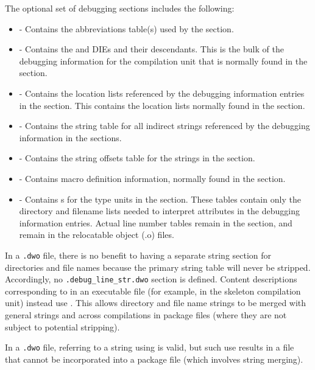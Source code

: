 The optional set of debugging sections includes the following:
\begin{itemize}
\item
\dotdebugabbrevdwo{} - Contains the abbreviations table(s) used by
the \dotdebuginfodwo{} section.
\item
\dotdebuginfodwo{} - Contains the \DWTAGcompileunit{} and
\DWTAGtypeunit{} DIEs and
their descendants. This is the bulk of the debugging
information for the compilation unit that is normally found
in the \dotdebuginfo{} section.
\item
\dotdebugloclistsdwo{} - Contains the location lists referenced by
the debugging information entries in the \dotdebuginfodwo{}
section. This contains the location lists normally found in 
the \dotdebugloclists{} section.
\bbeb
\item
\dotdebugstrdwo{} - Contains the string table for all indirect
strings referenced by the debugging information in the
\dotdebuginfodwo{} sections.
\item
\dotdebugstroffsetsdwo{} - Contains the string offsets table
for the strings in the \dotdebugstrdwo{}{} section.
\item
\dotdebugmacrodwo{} - Contains macro definition information,
normally found in the \dotdebugmacro{} section.
\item
\dotdebuglinedwo{} - Contains s 
for the type units in the \dotdebuginfodwo{} section. These tables
contain only the directory and filename lists needed to
interpret \DWATdeclfile{} attributes in the debugging
information entries. Actual line number tables remain in the
\dotdebugline{} section, and remain in the relocatable object
(.o) files.

\end{itemize}

In a \texttt{.dwo} file, there is no benefit to having a separate string
section for directories and file names because the primary
string table will never be stripped. Accordingly, no
\texttt{.debug\_line\_str.dwo} section is defined. Content descriptions 
corresponding to \DWFORMlinestrp{} in an executable file (for example, 
in the skeleton compilation unit) instead use \DWFORMstrx. This allows
directory and file name strings to be merged with general
strings and across compilations in package files 
(where they are not subject to potential stripping).

In a \texttt{.dwo} file, referring to a string using \DWFORMstrp{}
is valid, but such use 
results in a file that cannot be incorporated into a package file
(which involves string merging).

